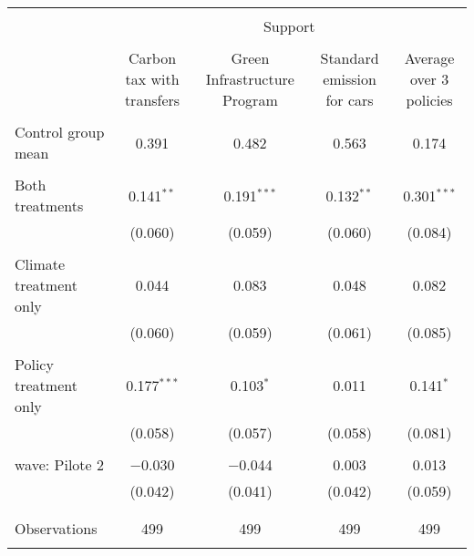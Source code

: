 
\begin{tabular}{@{\extracolsep{5pt}}lcccc} 
\\[-1.8ex]\hline 
\hline \\[-1.8ex] 
 & \multicolumn{4}{c}{Support} \\ 
\cline{2-5} 
\\[-1.8ex] & Carbon tax with transfers & Green Infrastructure Program & Standard emission for cars & Average over 3 policies \\ 
\hline \\[-1.8ex] 
 Control group mean & 0.391 & 0.482 & 0.563 & 0.174  \\ \hline \\[-1.8ex] Both treatments & 0.141$^{**}$ & 0.191$^{***}$ & 0.132$^{**}$ & 0.301$^{***}$ \\ 
  & (0.060) & (0.059) & (0.060) & (0.084) \\ 
  & & & & \\ 
 Climate treatment only & 0.044 & 0.083 & 0.048 & 0.082 \\ 
  & (0.060) & (0.059) & (0.061) & (0.085) \\ 
  & & & & \\ 
 Policy treatment only & 0.177$^{***}$ & 0.103$^{*}$ & 0.011 & 0.141$^{*}$ \\ 
  & (0.058) & (0.057) & (0.058) & (0.081) \\ 
  & & & & \\ 
 wave: Pilote 2 & $-$0.030 & $-$0.044 & 0.003 & 0.013 \\ 
  & (0.042) & (0.041) & (0.042) & (0.059) \\ 
  & & & & \\ 
\hline \\[-1.8ex] 

Observations & 499 & 499 & 499 & 499 \\ 
\hline 
\hline \\[-1.8ex] 
\end{tabular} 